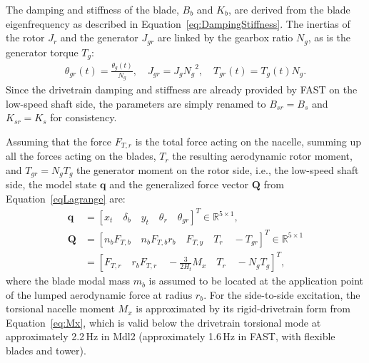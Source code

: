 The damping and stiffness of the blade, $B_b$ and $K_b$, are derived from the blade eigenfrequency as described in Equation~\eqref{eq:DampingStiffness}. %
The inertias of the rotor \(J_r\) and the generator \(J_{gr}\) are linked by the gearbox ratio \(N_g\), as is the generator torque \(T_g\):
\begin{align*}
    \theta_{gr}(t) = \frac{\theta_{g}(t)}{N_g}, \quad J_{gr} = J_{g}{N_g}^2,  \quad T_{gr}(t) = T_{g}(t)N_g. 
\end{align*}
Since the drivetrain damping and stiffness are already provided by FAST on the low-speed shaft side, the parameters are simply renamed to 
$B_{sr} = B_{s}$ and  $K_{sr} = K_{s}$ for consistency.

%
Assuming that the force \(F_{T,r}\) is the total force acting on the nacelle, summing up all the forces acting on the blades, $T_r$ the resulting aerodynamic rotor moment, and $T_{gr} = N_g T_g$ the generator moment on the rotor side, i.e., the low-speed shaft side, the model state \(\bm{q}\) and the generalized force vector \(\mathbf{Q}\) from Equation~\eqref{eqLagrange} are:
\begin{align*}
    \bm{q}& = [x_t \quad \delta_b \quad y_t \quad \theta_r \quad \theta_{gr}]^T  \in \mathbb{R}^{5 \times 1},\\
    \mathbf{Q} & = [n_b F_{T,b} \quad n_b F_{T,b}r_b \quad F_{T,y} \quad T_r \quad -T_{gr}]^T \in \mathbb{R}^{5 \times 1}\\
    & = \left[F_{T,r} \quad r_bF_{T,r} \quad -\tfrac{3}{2H_t}M_x\quad T_r \quad -N_g T_g\right]^T,
\end{align*}
where the blade modal mass $m_b$ is assumed to be located at the application point of the lumped aerodynamic force at radius $r_b$. For the side-to-side excitation, the torsional nacelle moment $M_x$ is approximated by its rigid-drivetrain form from Equation~\eqref{eq:Mx}, which is valid below the drivetrain torsional mode at approximately 2.2\,Hz in Mdl2 (approximately 1.6\,Hz in FAST, with flexible blades and tower).
    

